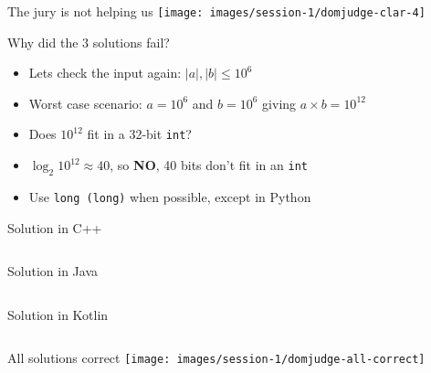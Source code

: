 \documentclass[11pt,pdf, aspectratio=169]{beamer}
\begin{document}
  \begin{frame}{The jury is not helping us}
    \texttt{[image: images/session-1/domjudge-clar-4]}
  \end{frame}
  \begin{frame}{Why did the 3 solutions fail?}
    \begin{itemize}
      \item <1-> Lets check the input again: $|a|,|b| \leq 10^6$
      \item <2-> Worst case scenario: $a=10^6$ and $b=10^6$ giving  $a \times b = 10^{12}$
      \item <3-> Does $10^{12}$ fit in a 32-bit \texttt{int}?
      \item <4-> $\log_2 10^{12} \approx 40$, so \textbf{NO}, 40 bits don't fit in an \texttt{int}
      \item <5-> Use \texttt{long (long)} when possible, except in Python
    \end{itemize}
  \end{frame}
  \begin{frame}[containsverbatim]{Solution in C++}
    \inputminted{c++}{code/session-1/c++/example.cpp}
  \end{frame}
  \begin{frame}[containsverbatim]{Solution in Java}
    \inputminted{java}{code/session-1/java/example.java}
  \end{frame}
  \begin{frame}[containsverbatim]{Solution in Kotlin}
    \inputminted{kotlin}{code/session-1/kotlin/example.kt}
  \end{frame}
  \begin{frame}{All solutions correct}
    \texttt{[image: images/session-1/domjudge-all-correct]}
  \end{frame}
\end{document}
